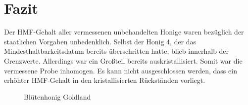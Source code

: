 \chapter{Fazit}
Der HMF-Gehalt aller vermessenen unbehandelten Honige waren bezüglich der staatlichen Vorgaben unbedenklich. Selbst der Honig 4, der das Mindesthaltbarkeitsdatum bereits überschritten hatte, blieb innerhalb der Grenzwerte. Allerdings war ein Großteil bereits auskristallisiert. Somit war die vermessene Probe inhomogen. Es kann nicht ausgeschlossen werden, dass ein erhöhter HMF-Gehalt in den kristallisierten Rückständen vorliegt.\\
\begin{figure}[htbp]
  \centering
  \caption{Blütenhonig Goldland}
  \label{fig:Blütenhonig}
\end{figure}

